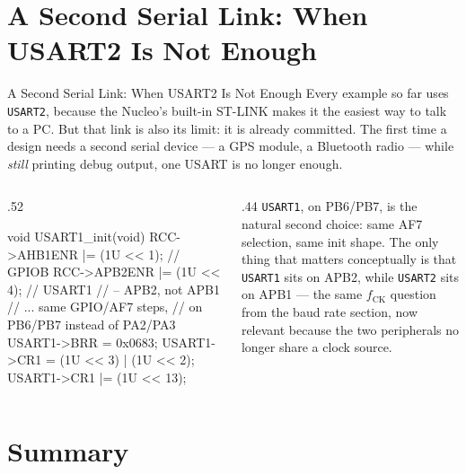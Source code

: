 \documentclass[9pt,aspectratio=169,xcolor=table]{beamer}
\begin{document}
\section{A Second Serial Link: When USART2 Is Not Enough}

\begin{frame}[fragile]{A Second Serial Link: When USART2 Is Not Enough}
    \leavevmode
    {\small Every example so far uses \texttt{USART2}, because the Nucleo's
    built-in ST-LINK makes it the easiest way to talk to a PC. But that link is
    also its limit: it is already committed. The first time a design needs a
    \alert{second} serial device --- a GPS module, a Bluetooth radio --- while
    \emph{still} printing debug output, one USART is no longer enough.}

    \vspace{2mm}
    \begin{columns}[c]
    \begin{column}{.52\textwidth}
    \begin{cc}[basicstyle=\scriptsize\ttfamily]
void USART1_init(void)
{
    RCC->AHB1ENR |= (1U << 1);  // GPIOB
    RCC->APB2ENR |= (1U << 4);  // USART1
                                 // -- APB2, not APB1
    // ... same GPIO/AF7 steps,
    // on PB6/PB7 instead of PA2/PA3
    USART1->BRR = 0x0683;
    USART1->CR1 = (1U << 3) | (1U << 2);
    USART1->CR1 |= (1U << 13);
}
\end{cc}
    \end{column}
    \begin{column}{.44\textwidth}
        {\small \texttt{USART1}, on PB6/PB7, is the natural second choice: same
        AF7 selection, same init shape. The only thing that matters
        conceptually is that \texttt{USART1} sits on \alert{APB2}, while
        \texttt{USART2} sits on \alert{APB1} --- the same $f_{\text{CK}}$
        question from the baud rate section, now relevant because the two
        peripherals no longer share a clock source.}
    \end{column}
    \end{columns}
\end{frame}


\section{Summary}
\end{document}
